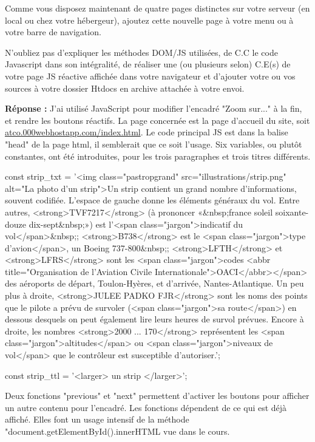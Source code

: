 \documentclass[11pt]{article}
\begin{document}
Comme vous disposez maintenant de quatre pages distinctes sur votre serveur (en local ou chez votre hébergeur), ajoutez cette nouvelle page à votre menu ou à votre barre de navigation.
 
N’oubliez pas d’expliquer les méthodes DOM/JS utilisées, de C.C le code Javascript dans son intégralité, de réaliser une (ou plusieurs selon) C.E(s) de votre page JS réactive affichée dans votre navigateur et d’ajouter votre ou vos sources à votre dossier Htdocs en archive attachée à votre envoi.

\smallskip

\textbf{Réponse :} J’ai utilisé JavaScript pour modifier l’encadré "Zoom sur..." à la fin, et rendre les boutons réactifs. La page concernée est la page d’accueil du site, soit \url{atco.000webhostapp.com/index.html}. Le code principal JS est dans la balise "head" de la page html, il semblerait que ce soit l’usage. Six variables, ou plutôt constantes, ont été introduites, pour les trois paragraphes et trois titres différents.

\smallskip

\begin{code2}
const strip_txt = '<img class="pastropgrand" src="illustrations/strip.png" alt="La photo d'un strip">Un strip contient un grand nombre d'informations, souvent codifiée. L'espace de gauche donne les éléments généraux du vol. Entre autres, <strong>TVF7217</strong> (à prononcer «&nbsp;france soleil soixante-douze dix-sept&nbsp;») est l'<span class="jargon">indicatif du vol</span>&nbsp;; <strong>B738</strong> est le <span class="jargon">type d'avion</span>, un Boeing 737-800&nbsp;; <strong>LFTH</strong> et <strong>LFRS</strong> sont les <span class="jargon">codes <abbr title="Organisation de l'Aviation Civile Internationale">OACI</abbr></span> des aéroports de départ, Toulon-Hyères, et d'arrivée, Nantes-Atlantique. Un peu plus à droite, <strong>JULEE PADKO FJR</strong> sont les noms des points que le pilote a prévu de survoler (<span class="jargon">sa route</span>) en dessous desquels on peut également lire leurs heures de survol prévues. Encore à droite, les nombres <strong>2000 ... 170</strong> représentent les <span class="jargon">altitudes</span> ou <span class="jargon">niveaux de vol</span> que le contrôleur est susceptible d'autoriser.';

const strip_ttl = '<larger> un strip </larger>';\end{code2}

Deux fonctions "previous" et "next" permettent d’activer les boutons pour afficher un autre contenu pour l’encadré. Les fonctions dépendent de ce qui est déjà affiché. Elles font un usage intensif de la méthode "document.getElementById().innerHTML vue dans le cours.
\end{document}
